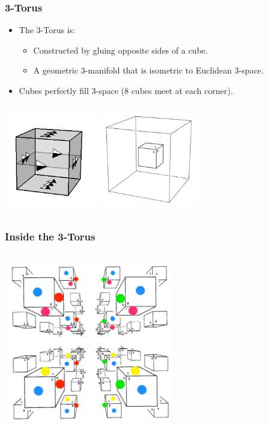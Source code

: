 \documentclass[13pt]{beamer}
\begin{document}
\begin{frame}
\frametitle{3-Torus}
  \begin{itemize}
    \item The \alert{3-Torus} is:
          \begin{itemize}
             \item Constructed by gluing opposite sides of a cube.
             \item A geometric 3-manifold that is isometric to Euclidean 3-space.
           \end{itemize} 
    \item Cubes perfectly fill 3-space (8 cubes meet at each corner).
  \end{itemize}
  \begin{columns}[r] %
     \centering
     \includegraphics[height=4cm]{./img/cubegluing}
     \centering
     \includegraphics[height=4cm]{./img/torus3} %
  \end{columns}
\end{frame}

\begin{frame}
\frametitle{Inside the 3-Torus}
  \begin{columns}[c] %
     \centering
     \includegraphics[height=7cm]{./img/inside3torus}
  \end{columns}
\end{frame}
\end{document}
